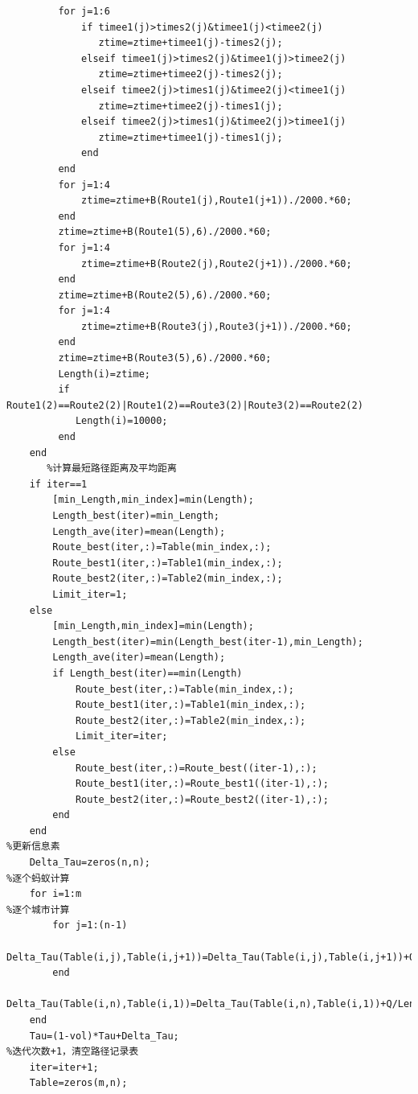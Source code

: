 \documentclass[hyperref,UTF8]{article}
\begin{document}
\begin{lstlisting}
         for j=1:6
             if timee1(j)>times2(j)&timee1(j)<timee2(j)
                ztime=ztime+timee1(j)-times2(j);
             elseif timee1(j)>times2(j)&timee1(j)>timee2(j)
                ztime=ztime+timee2(j)-times2(j);
             elseif timee2(j)>times1(j)&timee2(j)<timee1(j)
                ztime=ztime+timee2(j)-times1(j);
             elseif timee2(j)>times1(j)&timee2(j)>timee1(j)
                ztime=ztime+timee1(j)-times1(j);
             end
         end
         for j=1:4
             ztime=ztime+B(Route1(j),Route1(j+1))./2000.*60;
         end
         ztime=ztime+B(Route1(5),6)./2000.*60;
         for j=1:4
             ztime=ztime+B(Route2(j),Route2(j+1))./2000.*60;
         end
         ztime=ztime+B(Route2(5),6)./2000.*60;
         for j=1:4
             ztime=ztime+B(Route3(j),Route3(j+1))./2000.*60;
         end
         ztime=ztime+B(Route3(5),6)./2000.*60;
         Length(i)=ztime;
         if Route1(2)==Route2(2)|Route1(2)==Route3(2)|Route3(2)==Route2(2)
            Length(i)=10000;
         end
    end
       %计算最短路径距离及平均距离
    if iter==1
        [min_Length,min_index]=min(Length);
        Length_best(iter)=min_Length;
        Length_ave(iter)=mean(Length);
        Route_best(iter,:)=Table(min_index,:);
        Route_best1(iter,:)=Table1(min_index,:);
        Route_best2(iter,:)=Table2(min_index,:);
        Limit_iter=1;
    else 
        [min_Length,min_index]=min(Length);
        Length_best(iter)=min(Length_best(iter-1),min_Length);
        Length_ave(iter)=mean(Length);
        if Length_best(iter)==min(Length)
            Route_best(iter,:)=Table(min_index,:);
            Route_best1(iter,:)=Table1(min_index,:);
            Route_best2(iter,:)=Table2(min_index,:);
            Limit_iter=iter;
        else
            Route_best(iter,:)=Route_best((iter-1),:);
            Route_best1(iter,:)=Route_best1((iter-1),:);
            Route_best2(iter,:)=Route_best2((iter-1),:);
        end
    end                                                                         %更新信息素
    Delta_Tau=zeros(n,n);                                               %逐个蚂蚁计算
    for i=1:m                                                                   %逐个城市计算
        for j=1:(n-1)
            Delta_Tau(Table(i,j),Table(i,j+1))=Delta_Tau(Table(i,j),Table(i,j+1))+Q/Length(i);
        end
        Delta_Tau(Table(i,n),Table(i,1))=Delta_Tau(Table(i,n),Table(i,1))+Q/Length(i);
    end
    Tau=(1-vol)*Tau+Delta_Tau;                                              %迭代次数+1，清空路径记录表
    iter=iter+1;
    Table=zeros(m,n);
    

\end{lstlisting}
\end{document}

